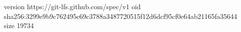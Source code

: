 version https://git-lfs.github.com/spec/v1
oid sha256:3299e9b9c762495c69c3788a3487720515f12d6dcf95cf0e64ab21165fa35644
size 19734
